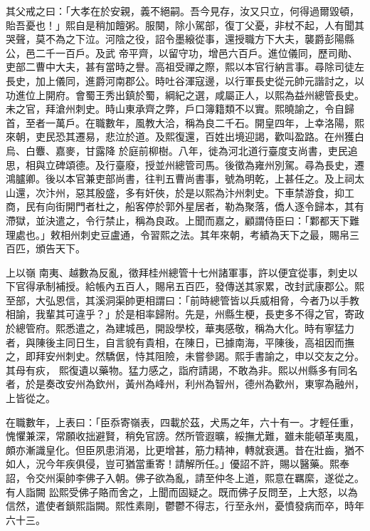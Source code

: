 \begin{pinyinscope}
 其父戒之曰：「大孝在於安親，義不絕嗣。吾今見存，汝又只立，何得過爾毀頓，貽吾憂也！」熙自是稍加饘粥。服闋，除小駕部，復丁父憂，非杖不起，人有聞其哭聲，莫不為之下泣。河陰之役，詔令墨縗從事，還授職方下大夫，襲爵彭陽縣公，邑二千一百戶。及武
 帝平齊，以留守功，增邑六百戶。進位儀同，歷司勛、吏部二曹中大夫，甚有當時之譽。高祖受禪之際，熙以本官行納言事。尋除司徒左長史，加上儀同，進爵河南郡公。時吐谷渾寇邊，以行軍長史從元帥元諧討之，以功進位上開府。會蜀王秀出鎮於蜀，綱紀之選，咸屬正人，以熙為益州總管長史。未之官，拜滄州刺史。時山東承齊之弊，戶口簿籍類不以實。熙曉諭之，令自歸首，至者一萬戶。在職數年，風教大洽，稱為良二千石。開皇四年，上幸洛陽，熙來朝，吏民恐其遷易，悲泣於道。及熙復還，百姓出境迎謁，歡叫盈路。在州獲白烏、白麞、嘉麥，甘露降
 於庭前柳樹。八年，徙為河北道行臺度支尚書，吏民追思，相與立碑頌德。及行臺廢，授並州總管司馬。後徵為雍州別駕。尋為長史，遷鴻臚卿。後以本官兼吏部尚書，往判五曹尚書事，號為明乾，上甚任之。及上祠太山還，次汴州，惡其殷盛，多有奸俠，於是以熙為汴州刺史。下車禁游食，抑工商，民有向街開門者杜之，船客停於郭外星居者，勒為聚落，僑人逐令歸本，其有滯獄，並決遣之，令行禁止，稱為良政。上聞而嘉之，顧謂侍臣曰：「鄴都天下難理處也。」敕相州刺史豆盧通，令習熙之法。其年來朝，考績為天下之最，賜帛三百匹，頒告天下。



 上以嶺
 南夷、越數為反亂，徵拜桂州總管十七州諸軍事，許以便宜從事，刺史以下官得承制補授。給帳內五百人，賜帛五百匹，發傳送其家累，改封武康郡公。熙至部，大弘恩信，其溪洞渠帥更相謂曰：「前時總管皆以兵威相脅，今者乃以手教相諭，我輩其可違乎？」於是相率歸附。先是，州縣生梗，長吏多不得之官，寄政於總管府。熙悉遣之，為建城邑，開設學校，華夷感敬，稱為大化。時有寧猛力者，與陳後主同日生，自言貌有貴相，在陳日，已據南海，平陳後，高祖因而撫之，即拜安州刺史。然驕倨，恃其阻險，未嘗參謁。熙手書諭之，申以交友之分。其母有疢，
 熙復遺以藥物。猛力感之，詣府請謁，不敢為非。熙以州縣多有同名者，於是奏改安州為欽州，黃州為峰州，利州為智州，德州為歡州，東寧為融州，上皆從之。



 在職數年，上表曰：「臣忝寄嶺表，四載於茲，犬馬之年，六十有一。才輕任重，愧懼兼深，常願收拙避賢，稍免官謗。然所管遐曠，綏撫尤難，雖未能頓革夷風，頗亦漸識皇化。但臣夙患消渴，比更增甚，筋力精神，轉就衰邁。昔在壯齒，猶不如人，況今年疾俱侵，豈可猶當重寄！請解所任。」優詔不許，賜以醫藥。熙奉詔，令交州渠帥李佛子入朝。佛子欲為亂，請至仲冬上道，熙意在羈縻，遂從之。有人詣闕
 訟熙受佛子賂而舍之，上聞而固疑之。既而佛子反問至，上大怒，以為信然，遣使者鎖熙詣闕。熙性素剛，鬱鬱不得志，行至永州，憂憤發病而卒，時年六十三。




\end{pinyinscope}
